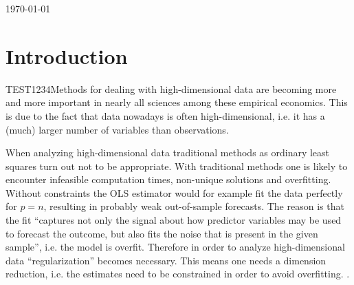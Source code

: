 \documentclass{article}
\theoremstyle{definition}
\begin{document}
\begin{titlepage}
	
	
	\vfill\vfill\vfill %
	
	{\large\today} %
	
	
	 
	
	\vfill %
	
\end{titlepage} \newpage


\tableofcontents \newpage


\listoffigures \newpage


\listoftables \newpage



\section{Introduction}
TEST1234Methods for dealing with high-dimensional data are becoming more and more important in nearly all sciences among these empirical economics. This is due to the fact that data nowadays is often high-dimensional, i.e. it has a (much) larger number of variables than observations.

When analyzing high-dimensional data traditional methods as ordinary least squares turn out not to be appropriate. With traditional methods one is likely to encounter infeasible computation times, non-unique solutions and overfitting. Without constraints the OLS estimator would for example fit the data perfectly for $p=n$, resulting in probably weak out-of-sample forecasts. The reason is that the fit “captures not only the signal about how predictor variables may be used to forecast the outcome, but also fits the noise that is present in the given sample”, i.e. the model is overfit.
Therefore in order to analyze high-dimensional data “regularization” becomes necessary. This means one needs a dimension reduction, i.e. the estimates need to be constrained in order to avoid overfitting.  \citep{belloni2014}.
\end{document}
